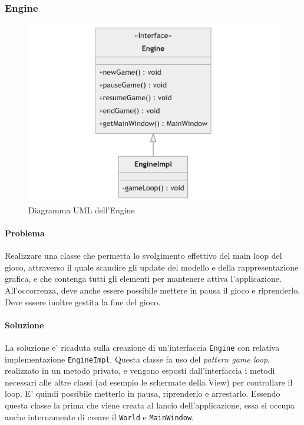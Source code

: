 \documentclass[a4paper,12pt]{report}
\begin{document}
\subsubsection{Engine}

\begin{figure}[h]
	\centering
	\includegraphics[width=\textwidth]{uml/uml_engine.png}
	\caption{Diagramma UML dell'Engine}
\end{figure}

\paragraph*{Problema}
Realizzare una classe che permetta lo svolgimento effettivo del main loop del gioco, attraverso il quale scandire gli update del modello e della rappresentazione grafica, e che contenga tutti gli elementi per mantenere attiva l'applicazione. All'occorrenza, deve anche essere possibile mettere in pausa il gioco e riprenderlo. Deve essere inoltre gestita la fine del gioco.

\paragraph*{Soluzione} La soluzione e' ricaduta sulla creazione di un'interfaccia \texttt{Engine} con relativa implementazione \texttt{EngineImpl}. Questa classe fa uso del \textit{pattern game loop}, realizzato in un metodo privato, e vengono esposti dall'interfaccia i metodi necessari alle altre classi (ad esempio le schermate della View) per controllare il loop. E' quindi possibile metterlo in pausa, riprenderlo e arrestarlo. Essendo questa classe la prima che viene creata al lancio dell'applicazione, essa si occupa anche internamente di creare il \texttt{World} e \texttt{MainWindow}.
\end{document}
